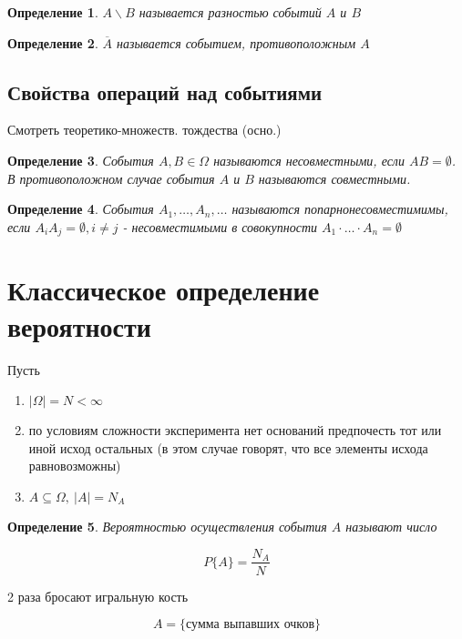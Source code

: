 \documentclass[a4paper, 14pt]{report}
\newtheorem{defenition}{Определение}[section]
\begin{document}
\begin{defenition}
    $A \backslash B$ называется разностью событий $A$ и $B$
\end{defenition}

\begin{defenition}
    $\overline{A}$ называется событием, противоположным $A$
\end{defenition}

\subsection{Свойства операций над событиями}

Смотреть теоретико-множеств. тождества (осно.)

\begin{defenition}
    События $A,B \in \Omega$ называются несовместными, если $AB = \emptyset$. В противоположном случае события $A$ и $B$ называются совместными.
\end{defenition}

\begin{defenition}
    События $A_1, \dots, A_n, \dots$ называются попарнонесовместимимы, если $A_i A_j = \emptyset, i \ne j$ - несовместимыми в совокупности $A_1 \cdot \dots \cdot A_n = \emptyset$
\end{defenition}

\section{Классическое определение вероятности}

Пусть

\begin{enumerate}
    \item $|\Omega| = N < \infty$
    \item по условиям сложности эксперимента нет оснований предпочесть тот или иной исход остальных (в этом случае говорят, что все элементы исхода равновозможны)
    \item $A \subseteq \Omega,\ |A| = N_A$
\end{enumerate}

\begin{defenition}
    Вероятностью осуществления события $A$ называют число

    $$
    P\{A\} = \frac{N_A}{N}
    $$
\end{defenition}

2 раза бросают игральную кость

$$
A = \{ \text{сумма выпавших очков} \}
$$
\end{document}
